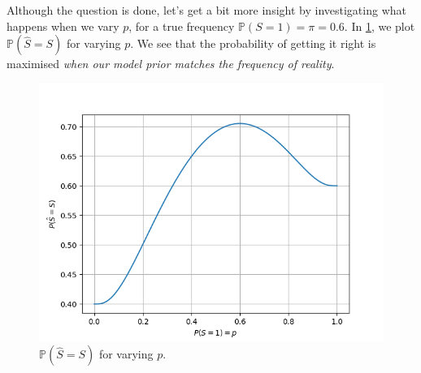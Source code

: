 Although the question is done, let's get a bit more insight by investigating what happens when we vary $p$, for a true frequency $\mathbb P(S = 1) = \pi = 0.6$. In \cref{fig:elec-comm-errors-varyp}, we plot $\mathbb P(\hat S = S)$ for varying $p$. We see that the probability of getting it right is maximised \emph{when our model prior matches the frequency of reality}.

\begin{figure}[h]
\label{fig:elec-comm-errors-varyp}
\centering
\includegraphics[width=0.8\linewidth]{elec-decoding-errors.png}
\caption{$\mathbb P(\hat S = S)$ for varying $p$.}
\end{figure}
